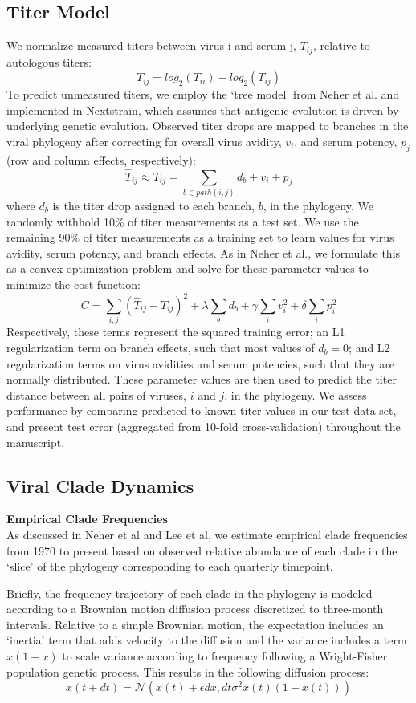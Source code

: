 \documentclass[11pt,oneside,letterpaper]{article}
\begin{document}
\subsection*{Titer Model}
We normalize measured titers between virus i and serum j, $T_{ij}$, relative to autologous titers: $$T_{ij} = log_2(T_{ii}) - log_2(T_{ij})$$
To predict unmeasured titers, we employ the `tree model' from Neher et al. and implemented in Nextstrain, which assumes that antigenic evolution is driven by underlying genetic evolution.
Observed titer drops are mapped to branches in the viral phylogeny after correcting for overall virus avidity, $v_i$, and serum potency, $p_j$ (row and column effects, respectively):
$$\hat{T}_{ij} \approx T_{ij} = \sum_{b \in path(i,j)} d_b + v_i + p_j$$
where $d_b$ is the titer drop assigned to each branch, $b$, in the phylogeny.
We randomly withhold 10\% of titer measurements as a test set.
We use the remaining 90\% of titer measurements as a training set to learn values for virus avidity, serum potency, and branch effects.
As in Neher et al., we formulate this as a convex optimization problem and solve for these parameter values to minimize the cost function:
$$C = \sum_{i,j} (\hat{T}_{ij} - T_{ij})^2 + \lambda \sum_{b} d_b + \gamma \sum_{i} v_i^2 + \delta \sum_{i} p_i^2$$
Respectively, these terms represent the squared training error; an L1 regularization term on branch effects, such that most values of $d_b = 0$; and L2 regularization terms on virus avidities and serum potencies, such that they are normally distributed.
These parameter values are then used to predict the titer distance between all pairs of viruses, $i$ and $j$, in the phylogeny.
We assess performance by comparing predicted to known titer values in our test data set, and present test error (aggregated from 10-fold cross-validation) throughout the manuscript.

\subsection*{Viral Clade Dynamics}

\textbf{Empirical Clade Frequencies}\\
As discussed in Neher et al and Lee et al, we estimate empirical clade frequencies from 1970 to present based on observed relative abundance of each clade in the `slice' of the phylogeny corresponding to each quarterly timepoint.

Briefly, the frequency trajectory of each clade in the phylogeny is modeled according to a Brownian motion diffusion process discretized to three-month intervals.
Relative to a simple Brownian motion, the expectation includes an `inertia' term that adds velocity to the diffusion and the variance includes a term $x(1-x)$ to scale variance according to frequency following a Wright-Fisher population genetic process.
This results in the following diffusion process:
$$x(t+dt) = \mathcal{N}(x(t) + \epsilon dx, dt \sigma^2 x(t) (1-x(t)))$$
\end{document}
